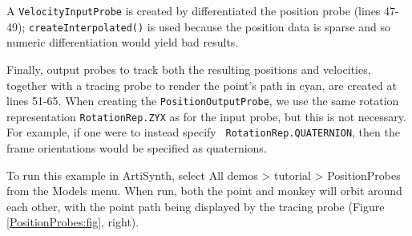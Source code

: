 A {\tt VelocityInputProbe} is created by differentiated the position probe
(lines 47-49); {\tt createInterpolated()} is used because the position data is
sparse and so numeric differentiation would yield bad results.

Finally, output probes to track both the resulting positions and velocities,
together with a tracing probe to render the point's path in cyan, are created
at lines 51-65. When creating the {\tt PositionOutputProbe}, we use the same
rotation representation {\tt RotationRep.ZYX} as for the input probe, but this
is not necessary. For example, if one were to instead specify {\tt
RotationRep.QUATERNION}, then the frame orientations would be specified as
quaternions.

To run this example in ArtiSynth, select {\sf All demos > tutorial >
PositionProbes} from the {\sf Models} menu. When run, both the point and monkey
will orbit around each other, with the point path being displayed by the tracing
probe (Figure \ref{PositionProbes:fig}, right).

